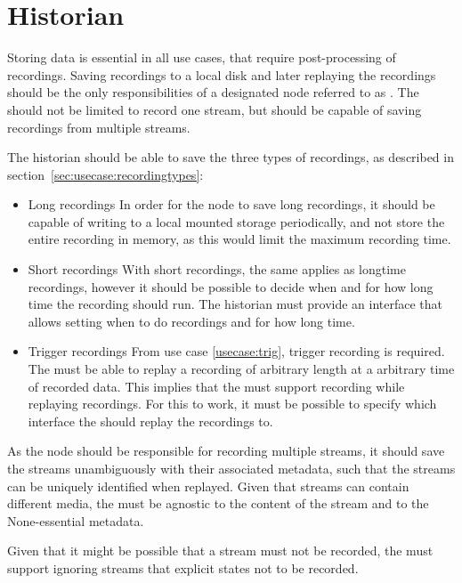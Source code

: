 \section{Historian} \label{sec:analysis:historian}

Storing data is essential in all use cases, that require post-processing of recordings. Saving recordings to a local disk and later replaying the recordings should be the only responsibilities of a designated node referred to as .
The  should not be limited to record one stream, but should be capable of saving recordings from multiple streams. 

The historian should be able to save the  three types of recordings, as described in section~\ref{sec:usecase:recordingtypes}:
\begin{itemize}
	\item Long recordings
		In order for the node to save long recordings, it should be capable of writing to a local mounted storage periodically, and not store the entire recording in memory, as this would limit the maximum recording time.

	\item Short recordings
		With short recordings, the same applies as longtime recordings, however it should be possible to decide when and for how long time the recording should run. The historian must provide an interface that allows setting when to do recordings and for how long time.
	\item Trigger recordings
		From use case \ref{usecase:trig}, trigger recording is required. The  must be able to replay a recording of arbitrary length at a arbitrary time of recorded data. This implies that the  must support recording while replaying recordings. For this to work, it must be possible to specify which interface the  should replay the recordings to.
\end{itemize}

As the node should be responsible for recording multiple streams, it should save the streams unambiguously with their associated metadata, such that the streams can be uniquely identified when replayed.
Given that streams can contain different media, the  must be agnostic to the content of the stream and to the None-essential metadata.

Given that it might be possible that a stream must not be recorded, the  must support ignoring streams that explicit states not to be recorded.

